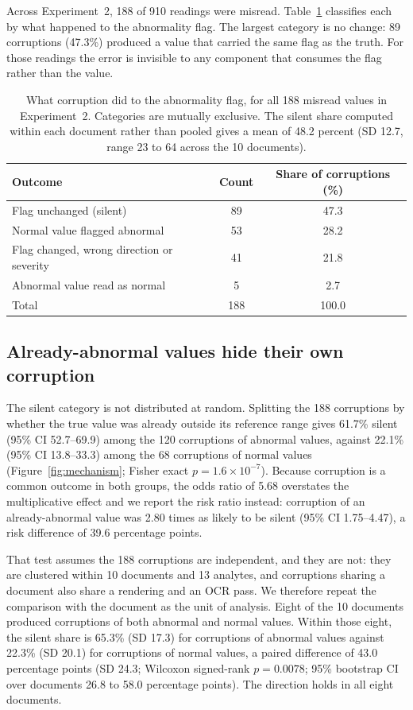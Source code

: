 \documentclass[11pt]{article}
\begin{document}
Across Experiment~2, 188 of 910 readings were misread. Table~\ref{tab:taxonomy} classifies each
by what happened to the abnormality flag. The largest category is no change: 89 corruptions
(47.3\%) produced a value that carried the same flag as the truth. For those
readings the error is invisible to any component that consumes the flag rather than the value.

\begin{table}[t]
\centering
\caption{What corruption did to the abnormality flag, for all 188 misread values in
Experiment~2. Categories are mutually exclusive. The silent share computed within each document rather than pooled gives a mean of 48.2 percent (SD 12.7, range 23 to 64 across the 10 documents).}
\label{tab:taxonomy}
\small
\begin{tabular}{lcc}
\toprule
Outcome & Count & Share of corruptions (\%) \\
\midrule
Flag unchanged (silent)                 & 89 & 47.3 \\
Normal value flagged abnormal           & 53 & 28.2 \\
Flag changed, wrong direction or severity & 41 & 21.8 \\
Abnormal value read as normal           & \phantom{0}5 & \phantom{0}2.7 \\
\midrule
Total                                   & 188 & 100.0 \\
\bottomrule
\end{tabular}
\end{table}

\subsection{Already-abnormal values hide their own corruption}

The silent category is not distributed at random. Splitting the 188 corruptions by whether the
true value was already outside its reference range gives 61.7\% silent (95\% CI 52.7--69.9)
among the 120 corruptions of abnormal values, against 22.1\% (95\% CI 13.8--33.3) among the 68
corruptions of normal values (Figure~\ref{fig:mechanism}; Fisher exact
$p = 1.6 \times 10^{-7}$). Because corruption is a common outcome in both groups, the odds ratio
of 5.68 overstates the multiplicative effect and we report the risk ratio instead: corruption of
an already-abnormal value was 2.80 times as likely to be silent (95\% CI 1.75--4.47), a risk
difference of 39.6 percentage points.

That test assumes the 188 corruptions are independent, and they are not: they are clustered
within 10 documents and 13 analytes, and corruptions sharing a document also share a rendering
and an OCR pass. We therefore repeat the comparison with the document as the unit of analysis.
Eight of the 10 documents produced corruptions of both abnormal and normal values. Within those
eight, the silent share is 65.3\% (SD 17.3) for corruptions of abnormal values against 22.3\%
(SD 20.1) for corruptions of normal values, a paired difference of 43.0 percentage points
(SD 24.3; Wilcoxon signed-rank $p = 0.0078$; 95\% bootstrap CI over documents 26.8 to 58.0
percentage points). The direction holds in all eight documents.
\end{document}
